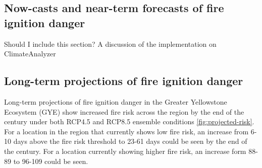 \documentclass[11pt]{article}
\begin{document}
\subsection{Now-casts and near-term forecasts of fire ignition danger}

Should I include this section? A discussion of the implementation on ClimateAnalyzer

\subsection{Long-term projections of fire ignition danger}

Long-term projections of fire ignition danger in the Greater Yellowstone Ecosystem (GYE) show increased fire risk across the region by the end of the century under both RCP4.5 and RCP8.5 ensemble conditions \ref{fig:projected-risk}.  For a location in the region that currently shows low fire risk, an increase from 6-10 days above the fire risk threshold to 23-61 days could be seen by the end of the century.  For a location currently showing higher fire risk, an increase form 88-89 to 96-109 could be seen.




\clearpage

\printbibliography[
heading=bibintoc,
title={References}
]
\end{document}
